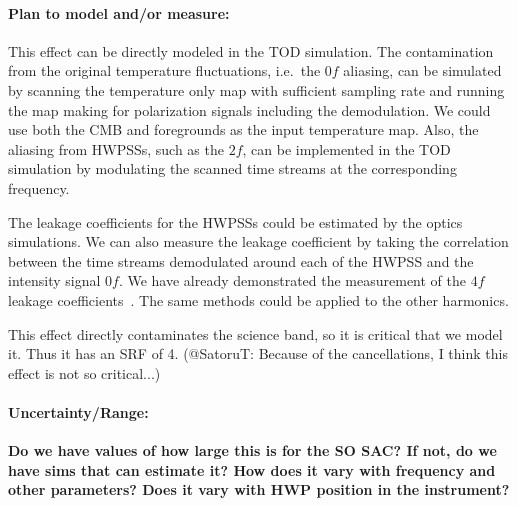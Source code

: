 \paragraph{Plan to model and/or measure:}

This effect can be directly modeled in the TOD simulation.
The contamination from the original temperature fluctuations, i.e.\ the $0f$ aliasing, 
can be simulated by scanning the temperature only map with sufficient sampling rate and running the map making for polarization signals including the demodulation.
We could use both the CMB and foregrounds as the input temperature map.
Also, the aliasing from HWPSSs, such as the $2f$, can be implemented in the TOD simulation by modulating the scanned time streams at the corresponding frequency.

The leakage coefficients for the HWPSSs could be estimated by the optics simulations.
We can also measure the leakage coefficient by taking the correlation between the time streams demodulated around each of the HWPSS and the intensity signal $0f$.
We have already demonstrated the measurement of the $4f$ leakage coefficients~\cite{Essinger-Hileman2016,Didier_Thesis,PB1_WHWP}.
The same methods could be applied to the other harmonics.



This effect directly contaminates the science band, so it is critical that we model it. Thus it has an SRF of 4.
(@SatoruT: Because of the cancellations, I think this effect is not so critical...)

\paragraph{Uncertainty/Range:}
\textbf{Do we have values of how large this is for the SO SAC? If not, do we have sims that can estimate it? How does it vary with frequency and other parameters? Does it vary with HWP position in the instrument?}


